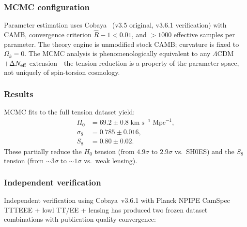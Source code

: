 \documentclass[aps,prd,twocolumn,superscriptaddress,showpacs,preprintnumbers,
  nofootinbib,longbibliography,floatfix]{revtex4-2}
\newcommand{\Neff}{N_{\rm eff}}
\begin{document}
\subsubsection{MCMC configuration}

Parameter estimation uses Cobaya~\cite{Cobaya2021} (v3.5 original,
v3.6.1 verification) with CAMB, convergence criterion $\hat{R}-1<0.01$,
and $>1000$ effective samples per parameter. The theory engine is
unmodified stock CAMB; curvature is fixed to $\Omega_k = 0$.
The MCMC analysis is phenomenologically equivalent to any
$\Lambda$CDM$+\Delta\Neff$ extension---the tension reduction is a
property of the parameter space, not uniquely of spin-torsion cosmology.

\subsubsection{Results}

MCMC fits to the full tension dataset yield:
\begin{align}
  H_0 &= 69.2 \pm 0.8 \;\text{km}\;\text{s}^{-1}\;\text{Mpc}^{-1},
    \label{eq:H0}\\
  \sigma_8 &= 0.785 \pm 0.016, \label{eq:s8}\\
  S_8 &= 0.80 \pm 0.02. \label{eq:S8}
\end{align}
These partially reduce the $H_0$ tension (from $4.9\sigma$ to
$2.9\sigma$ vs.\ SH0ES) and the $S_8$ tension (from $\sim\!3\sigma$ to
$\sim\!1\sigma$ vs.\ weak lensing).

\subsubsection{Independent verification}\label{sec:verification}

Independent verification using Cobaya~v3.6.1 with Planck NPIPE CamSpec
TTTEEE + lowl TT/EE + lensing has produced two frozen dataset
combinations with publication-quality convergence:
\end{document}
